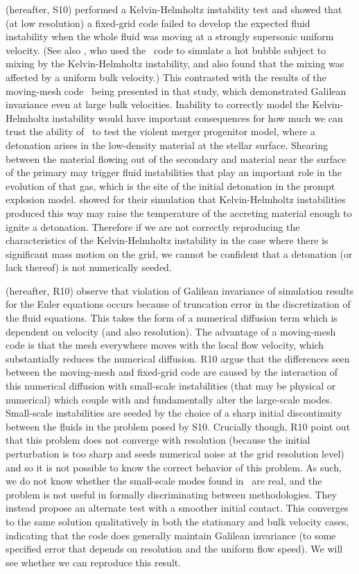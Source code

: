 \documentclass[12pt]{article}
\begin{document}
\citet{arepo} (hereafter, S10) performed a Kelvin-Helmholtz instability test and showed
that (at low resolution) a fixed-grid code failed to develop the
expected fluid instability when the whole fluid was moving at a
strongly supersonic uniform velocity. (See also \citet{wadsley:2008},
who used the \flash\ code to simulate a hot bubble subject to mixing
by the Kelvin-Helmholtz instability, and also found that the mixing was affected by a
uniform bulk velocity.) This contrasted with the results
of the moving-mesh code \arepo\ being presented in that study, which
demonstrated Galilean invariance even at large bulk velocities.
Inability to correctly model the Kelvin-Helmholtz instability would
have important consequences for how much we can trust the ability of
\castro\ to test the violent merger progenitor model, where a detonation
arises in the low-density material at the stellar surface. Shearing between
the material flowing out of the secondary and material near the
surface of the primary may trigger fluid
instabilities that play an important role in the evolution of that
gas, which is the site of the initial detonation in the prompt
explosion model. \citet{guillochon:2010} showed for their simulation
that Kelvin-Helmholtz instabilities produced this way may raise the
temperature of the accreting material enough to ignite a
detonation. Therefore if we are not correctly reproducing the
characteristics of the Kelvin-Helmholtz instability in the case where
there is significant mass motion on the grid, we cannot be confident
that a detonation (or lack thereof) is not numerically
seeded.

\citet{robertson:2010} (hereafter, R10) observe that violation of Galilean
invariance of simulation results for the Euler equations occurs
because of truncation error in the discretization of the fluid
equations. This takes the form of a numerical diffusion term which is
dependent on velocity (and also resolution). The advantage of a
moving-mesh code is that the mesh everywhere moves with the local flow
velocity, which substantially reduces the numerical
diffusion. R10 argue that the differences seen
between the moving-mesh and fixed-grid code are caused by the
interaction of this numerical diffusion with small-scale instabilities
(that may be physical or numerical) which couple with and
fundamentally alter the large-scale modes. Small-scale instabilities
are seeded by the choice of a sharp initial discontinuity between the
fluids in the problem posed by S10. Crucially though,
R10 point out that this problem does not
converge with resolution (because the initial perturbation is too sharp
and seeds numerical noise at the grid resolution level)
and so it is not possible to know the correct
behavior of this problem. As such, we do not know whether the
small-scale modes found in \arepo\ are real, and the problem is not
useful in formally discriminating between methodologies. They instead
propose an alternate test with a smoother initial contact. This
converges to the same solution qualitatively in both the stationary
and bulk velocity cases, indicating that the code does generally
maintain Galilean invariance (to some specified error that depends on
resolution and the uniform flow speed).  We will see whether we can
reproduce this result.
\end{document}
